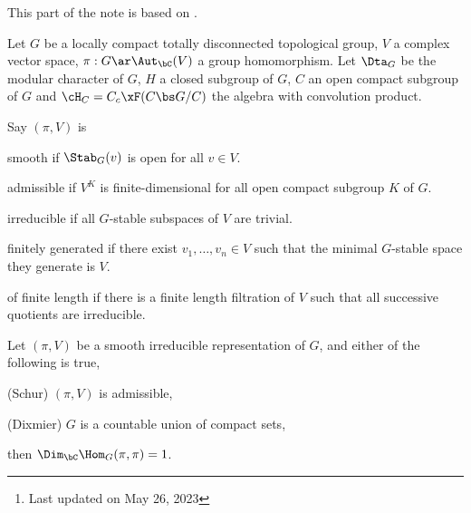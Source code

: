 \documentclass[a4paper, twoside]{article}
\title{\tbf{Topics in representation theory}}
\author{\tbf{Notes} by Cong Wen, 05/2023}
\date{}
\begin{document}
\maketitle
\thispagestyle{empty}
\begin{abstract}
	This is my self-use notes\footnote{Last updated on May 26, 2023} on .

	Please reach out if you find anything incorrect.

\end{abstract}
\tableofcontents

This part of the note is based on \cite{PR2008}.


\begin{stp}
	Let $G$ be a locally compact totally disconnected topological group, $V$ a complex vector space, $\pi:G\ar\Aut_{\bC}(V)$ a group homomorphism. Let $\Dta_{G}$ be the modular character of $G$, $H$ a closed subgroup of $G$, $C$ an open compact subgroup of $G$ and $\cH_{C}=C_{c}\xF(C\bs G/C)$ the algebra with convolution product.
\end{stp}

\begin{dfn}
	Say $(\pi,V)$ is
	\begin{itm}
		\item smooth if $\Stab_{G}(v)$ is open for all $v\in V$.
		\item admissible if $V^{K}$ is finite-dimensional for all open compact subgroup $K$ of $G$.
		\item irreducible if all $G$-stable subspaces of $V$ are trivial.
		\item finitely generated if there exist $v_{1},\ldots,v_{n}\in V$ such that the minimal $G$-stable space they generate is $V$.
		\item of finite length if there is a finite length filtration of $V$ such that all successive quotients are irreducible.
	\end{itm}
\end{dfn}

\begin{thm}[{\cite[2.1, 2.4]{PR2008}}]
	Let $(\pi,V)$ be a smooth irreducible representation of $G$, and either of the following is true,
	\begin{itm}
		\item (Schur) $(\pi,V)$ is admissible,
		\item (Dixmier) $G$ is a countable union of compact sets,
	\end{itm}
	then $\Dim_{\bC}\Hom_{G}(\pi,\pi)=1$.
\end{thm}
\end{document}

